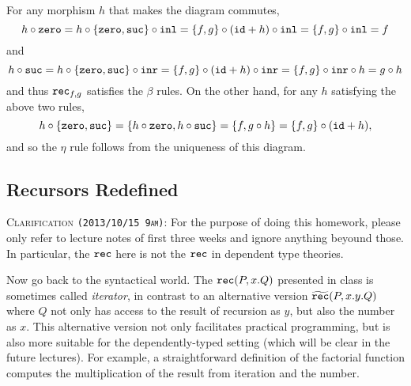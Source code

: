 \documentclass[12pt]{article}
\newcommand{\cut}[1]{}
\newcommand{\showsol}[1]{\color{FireBrick}#1\normalcolor}%
\newcommand{\showsol}[1]{\cut{#1}}%
\newenvironment{sol}{\trivlist \item[\hskip \labelsep{\bf
Solution:}]}{\endtrivlist}
\newcommand{\showextra}[1]{\color{DarkOliveGreen}#1\normalcolor}
\begin{document}
\showsol{
  \begin{sol}
    For any morphism $h$ that makes the diagram commutes,
    \[
      h \mathbin{\circ} \mathtt{zero}
      = h \mathbin{\circ} \{ \mathtt{zero},\mathtt{suc}\} \mathbin{\circ} \mathtt{inl}
      = \{ f,g\} \mathbin{\circ} (\mathtt{id} + h) \mathbin{\circ} \mathtt{inl}
      = \{ f,g\} \mathbin{\circ} \mathtt{inl}
      = f
    \]
    and
    \[
      h \mathbin{\circ} \mathtt{suc}
      = h \mathbin{\circ} \{ \mathtt{zero},\mathtt{suc}\} \mathbin{\circ} \mathtt{inr}
      = \{ f,g\} \mathbin{\circ} (\mathtt{id} + h) \mathbin{\circ} \mathtt{inr}
      = \{ f,g\} \mathbin{\circ} \mathtt{inr} \mathbin{\circ} h
      = g \mathbin{\circ} h
    \]
    and thus $\mathtt{rec}_{f,g}$ satisfies the $\beta$ rules.
    On the other hand, for any $h$ satisfying the above two rules,
    \[
      h \mathbin{\circ} \{ \mathtt{zero},\mathtt{suc}\}
      = \{ h \mathbin{\circ} \mathtt{zero},h \mathbin{\circ} \mathtt{suc}\}
      = \{ f,g \mathbin{\circ} h\}
      = \{ f,g\} \mathbin{\circ} (\mathtt{id} + h),
    \]
    and so the $\eta$ rule follows from the uniqueness of this diagram.
  \end{sol}
}

\subsection{Recursors Redefined}

\showextra{
  \begin{mdframed}[style=extra]
    \textsc{Clarification \texttt{(2013/10/15 9am)}:}
    For the purpose of doing this homework,
    please only refer to lecture notes of first three weeks
    and ignore anything beyound those.
    In particular, the $\mathtt{rec}$ here is not the $\mathtt{rec}$ in dependent type theories.
  \end{mdframed}
}

Now go back to the syntactical world.
The $\mathtt{rec}(P, x.Q)$ presented in class is sometimes called \emph{iterator},
in contrast to an alternative version $\widetilde{\mathtt{rec}}(P, x.y.Q)$
where $Q$ not only has access to the result of recursion as $y$,
but also the number as $x$.
This alternative version not only facilitates practical programming,
but is also more suitable for the dependently-typed setting
(which will be clear in the future lectures).
For example, a straightforward definition of the factorial function computes the multiplication of
the result from iteration and the number.
\end{document}

